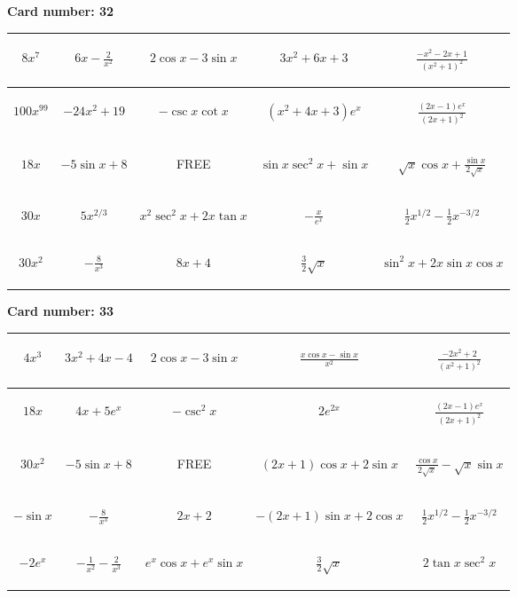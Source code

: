 \documentclass{article}
\newcommand{\entry}[1]{\begin{minipage}[t][2.75cm][t]{4cm} \vspace{1cm} \begin{center}#1\end{center} \end{minipage}}
\newcommand{\freespace}{\entry{FREE}}
\newcommand{\cardnumber}[1]{\noindent \textbf{Card number: #1} \bigskip}
\begin{document}
\pagebreak

\cardnumber{32}
\begin{center}
\begin{tabular}{|*{5}{c|}}
    \hline
    \entry{$8x^7$} & \entry{$6x - \frac{2}{x^2}$} & \entry{$2 \cos x - 3 \sin x$} & \entry{$3x^2 + 6x + 3$} & \entry{$\frac{-x^2 - 2x + 1}{(x^2 + 1)^2}$} \\ \hline
    \entry{$100x^{99}$} & \entry{$-24x^2 + 19$} & \entry{$-\csc x \cot x$} & \entry{$(x^2 + 4x + 3) e^x$} & \entry{$\frac{(2x - 1) e^x}{(2x + 1)^2}$} \\ \hline
    \entry{$18x$} & \entry{$-5 \sin x + 8$} & \freespace & \entry{$\sin x \sec^2 x + \sin x$} & \entry{$\sqrt{x} \cos x + \frac{\sin x}{2 \sqrt{x}}$} \\ \hline
    \entry{$30x$} & \entry{$5x^{2/3}$} & \entry{$x^2 \sec^2 x + 2x \tan x$} & \entry{$-\frac{x}{e^x}$} & \entry{$\frac{1}{2} x^{1/2} - \frac{1}{2} x^{-3/2}$} \\ \hline
    \entry{$30x^2$} & \entry{$-\frac{8}{x^3}$} & \entry{$8x + 4$} & \entry{$\frac{3}{2} \sqrt{x}$} & \entry{$\sin^2 x + 2x \sin x \cos x$} \\ \hline
\end{tabular}
\end{center}

\pagebreak

\cardnumber{33}
\begin{center}
\begin{tabular}{|*{5}{c|}}
    \hline
    \entry{$4x^3$} & \entry{$3x^2 + 4x - 4$} & \entry{$2 \cos x - 3 \sin x$} & \entry{$\frac{x \cos x - \sin x}{x^2}$} & \entry{$\frac{-2x^2 + 2}{(x^2 + 1)^2}$} \\ \hline
    \entry{$18x$} & \entry{$4x + 5e^x$} & \entry{$-\csc^2 x$} & \entry{$2e^{2x}$} & \entry{$\frac{(2x - 1) e^x}{(2x + 1)^2}$} \\ \hline
    \entry{$30x^2$} & \entry{$-5 \sin x + 8$} & \freespace & \entry{$(2x + 1) \cos x + 2 \sin x$} & \entry{$\frac{\cos x}{2 \sqrt{x}} - \sqrt{x} \sin x$} \\ \hline
    \entry{$-\sin x$} & \entry{$-\frac{8}{x^3}$} & \entry{$2x + 2$} & \entry{$-(2x + 1) \sin x + 2 \cos x$} & \entry{$\frac{1}{2} x^{1/2} - \frac{1}{2} x^{-3/2}$} \\ \hline
    \entry{$-2e^x$} & \entry{$-\frac{1}{x^2} - \frac{2}{x^3}$} & \entry{$e^x \cos x + e^x \sin x$} & \entry{$\frac{3}{2} \sqrt{x}$} & \entry{$2 \tan x \sec^2 x$} \\ \hline
\end{tabular}
\end{center}
\end{document}
